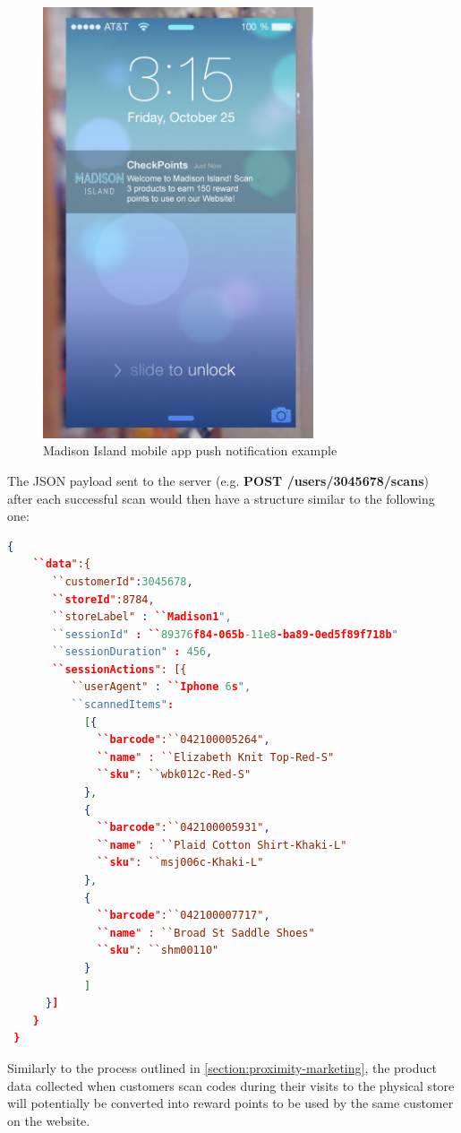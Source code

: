\vspace{0.5cm}
\begin{figure}[H]
  \centering
    \includegraphics[width=8cm]{images/madison-push-reward-points.jpg}
  \caption{Madison Island mobile app push notification example}
  \label{fig:mobile-app-push-notification}
\end{figure}
\vspace{0.5cm}


The JSON payload sent to the server (e.g. \textbf{POST /users/3045678/scans}) after each successful scan would then have a structure similar to the following one:
 
\vspace{0.5cm}
\begin{lstlisting}[language=json,firstnumber=1]
  {
    ``data":{
       ``customerId":3045678,
       ``storeId":8784,
       ``storeLabel" : ``Madison1",
       ``sessionId" : ``89376f84-065b-11e8-ba89-0ed5f89f718b"
       ``sessionDuration" : 456,
       ``sessionActions": [{
          ``userAgent" : ``Iphone 6s",
          ``scannedItems":
            [{
              ``barcode":``042100005264",
              ``name" : ``Elizabeth Knit Top-Red-S"
              ``sku": ``wbk012c-Red-S"    
            },
            {
              ``barcode":``042100005931",
              ``name" : ``Plaid Cotton Shirt-Khaki-L"
              ``sku": ``msj006c-Khaki-L"    
            },
            {
              ``barcode":``042100007717",
              ``name" : ``Broad St Saddle Shoes"
              ``sku": ``shm00110"    
            }
            ]
      }]
    }
 }
  \end{lstlisting}
\vspace{0.5cm}


Similarly to the process outlined in \ref{section:proximity-marketing}, the product data collected when customers scan codes during their visits to the physical store will potentially be converted into reward points to be used by the same customer on the website.  

